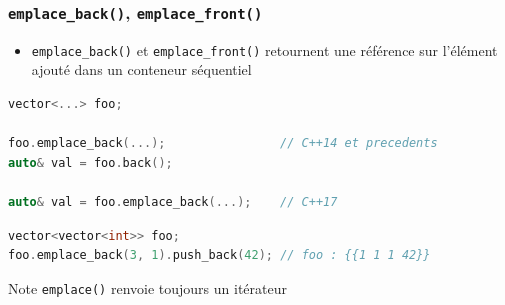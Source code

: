 \documentclass[C++.tex]{subfiles}
\begin{document}
\begin{frame}[fragile]
	\frametitle{\lstinline|emplace_back()|, \lstinline|emplace_front()|}
	\begin{itemize}
		\item \lstinline|emplace_back()| et \lstinline|emplace_front()| retournent une référence sur l'élément ajouté dans un conteneur séquentiel
	\end{itemize}

	\begin{lstlisting}[language=C++]
vector<...> foo;

foo.emplace_back(...);                // C++14 et precedents
auto& val = foo.back();

auto& val = foo.emplace_back(...);    // C++17\end{lstlisting}

	\begin{lstlisting}[language=C++]
vector<vector<int>> foo;
foo.emplace_back(3, 1).push_back(42); // foo : {{1 1 1 42}}\end{lstlisting}


	\begin{block}{Note}
		\lstinline|emplace()| renvoie toujours un itérateur
	\end{block}
\end{frame}
\end{document}
